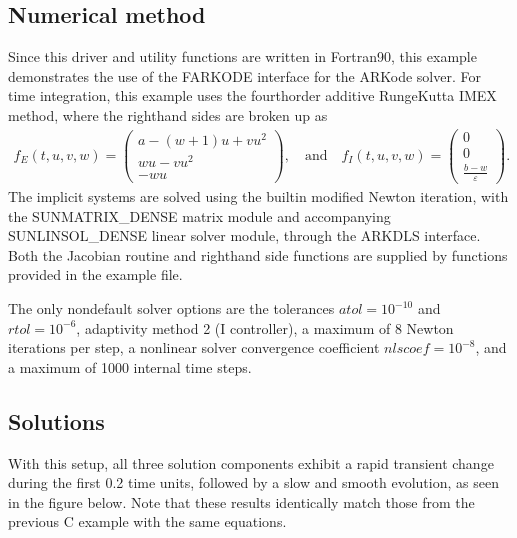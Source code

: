 \documentclass[letterpaper,10pt,english]{sphinxmanual}
\begin{document}
\subsection{Numerical method}
\label{\detokenize{f2003_serial:id7}}
\sphinxAtStartPar
Since this driver and utility functions are written in Fortran\sphinxhyphen{}90,
this example demonstrates the use of the FARKODE interface for the
ARKode solver.  For time integration, this example uses the
fourth\sphinxhyphen{}order additive Runge\sphinxhyphen{}Kutta IMEX method, where the right\sphinxhyphen{}hand
sides are broken up as
\begin{equation*}
\begin{split}f_E(t,u,v,w) = \left(\begin{array}{c} a - (w+1)u + v u^2 \\
  w u - v u^2 \\ - w u  \end{array}\right), \quad\text{and}\quad
f_I(t,u,v,w) = \left(\begin{array}{c} 0\\0\\
  \frac{b-w}{\varepsilon}\end{array}\right).\end{split}
\end{equation*}
\sphinxAtStartPar
The implicit systems are solved using the built\sphinxhyphen{}in modified Newton
iteration, with the SUNMATRIX\_DENSE matrix module and accompanying
SUNLINSOL\_DENSE linear solver module, through the ARKDLS interface.
Both the Jacobian routine and right\sphinxhyphen{}hand side functions are supplied
by functions provided in the example file.

\sphinxAtStartPar
The only non\sphinxhyphen{}default solver options are the tolerances
\(atol=10^{-10}\) and \(rtol=10^{-6}\), adaptivity method 2 (I
controller), a maximum of 8 Newton iterations per step, a nonlinear
solver convergence coefficient \(nlscoef=10^{-8}\), and a maximum
of 1000 internal time steps.


\subsection{Solutions}
\label{\detokenize{f2003_serial:solutions}}
\sphinxAtStartPar
With this setup, all three solution components exhibit a rapid
transient change during the first 0.2 time units, followed by a slow
and smooth evolution, as seen in the figure below.  Note that these
results identically match those from the previous C example with the
same equations.
\end{document}
